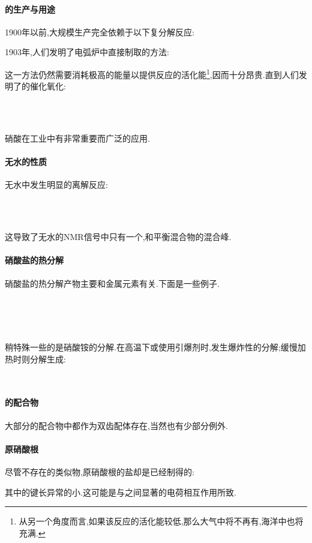 \documentclass{ctexart}
\begin{document}
\paragraph{的生产与用途}
1900年以前,大规模生产完全依赖于以下复分解反应:
\begin{center}
\end{center}
1903年,人们发明了电弧炉中直接制取的方法:
\begin{center}
\end{center}
这一方法仍然需要消耗极高的能量以提供反应的活化能\footnote{从另一个角度而言,如果该反应的活化能较低,那么大气中将不再有,海洋中也将充满.},因而十分昂贵.直到人们发明了的催化氧化:
\begin{center}
    \\
    \\
\end{center}

\indent 硝酸在工业中有非常重要而广泛的应用.
\paragraph{无水的性质}
无水中发生明显的离解反应:
\begin{center}
    \\
    \\
\end{center}
这导致了无水的NMR信号中只有一个,和平衡混合物的混合峰.
\paragraph{硝酸盐的热分解}
硝酸盐的热分解产物主要和金属元素有关.下面是一些例子.
\begin{center}
    \\
    \\
    \\
\end{center}
稍特殊一些的是硝酸铵的分解.在高温下或使用引爆剂时,发生爆炸性的分解;缓慢加热时则分解生成:
\begin{center}
    \\
\end{center}
\paragraph{的配合物}
大部分的配合物中都作为双齿配体存在,当然也有少部分例外.
\paragraph{原硝酸根}
尽管不存在的类似物,原硝酸根的盐却是已经制得的:
\begin{center}
\end{center}
其中的键长异常的小.这可能是与之间显著的电荷相互作用所致.
\end{document}
